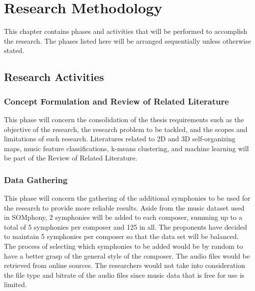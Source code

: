 %
%
%                 

\chapter{Research Methodology}
This chapter contains phases and activities that will be performed to accomplish the research. The phases listed here will be arranged sequentially unless otherwise stated.

\section{Research Activities}
\subsection{Concept Formulation and Review of Related Literature}
This phase will concern the consolidation of the thesis requirements such as the objective of the research, the research problem to be tackled, and the scopes and limitations of such research. Literatures related to 2D and 3D self-organizing maps, music feature classifications, k-means clustering, and  machine learning will be part of the Review of Related Literature.

\subsection{Data Gathering}

This phase will concern the  gathering of the additional symphonies to be used for the research to provide more reliable results. Aside from the music dataset used in SOMphony, 2 symphonies will be added to each composer, summing up to a total of 5 symphonies per composer and 125 in all. The proponents have decided to maintain 5 symphonies per composer so that the data set will be balanced. The process of selecting which symphonies to be added would be by random to have a better grasp of the general style of the composer. The audio files would be retrieved from online sources. The researchers  would not take into consideration the file type and bitrate of the audio files since music data that is free for use is limited. 


